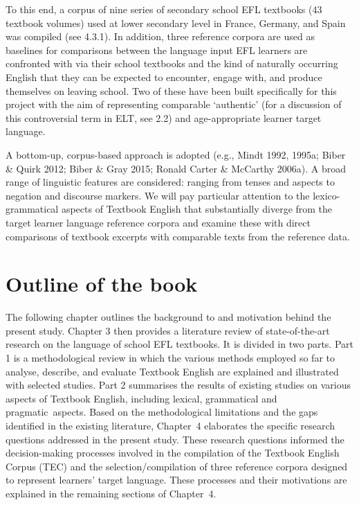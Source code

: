 \documentclass[
  letterpaper,
  DIV=11,
  numbers=noendperiod]{scrreprt}
\begin{document}
To this end, a corpus of nine series of secondary school EFL textbooks
(43 textbook volumes) used at lower secondary level in France, Germany,
and Spain was compiled (see 4.3.1). In addition, three reference corpora
are used as baselines for comparisons between the language input EFL
learners are confronted with via their school textbooks and the kind of
naturally occurring English that they can be expected to encounter,
engage with, and produce themselves on leaving school. Two of these have
been built specifically for this project with the aim of representing
comparable `authentic' (for a discussion of this controversial term in
ELT, see 2.2) and age-appropriate learner target language.

A bottom-up, corpus-based approach is adopted (e.g., Mindt 1992, 1995a;
Biber \& Quirk 2012; Biber \& Gray 2015; Ronald Carter \& McCarthy
2006a). A broad range of linguistic features are considered: ranging
from tenses and aspects to negation and discourse markers. We will pay
particular attention to the lexico-grammatical aspects of Textbook
English that substantially diverge from the target learner language
reference corpora and examine these with direct comparisons of textbook
excerpts with comparable texts from the reference data.

\section{Outline of the book}\label{outline-of-the-book}

The following chapter outlines the background to and motivation behind
the present study. Chapter 3 then provides a literature review of
state-of-the-art research on the language of school EFL textbooks. It is
divided in two parts. Part 1 is a methodological review in which the
various methods employed so far to analyse, describe, and evaluate
Textbook English are explained and illustrated with selected studies.
Part 2 summarises the results of existing studies on various aspects of
Textbook English, including lexical, grammatical and pragmatic~aspects.
Based on the methodological limitations and the gaps identified in the
existing literature, Chapter~4 elaborates the specific research
questions addressed in the present study. These research questions
informed the decision-making processes involved in the compilation of
the Textbook English Corpus (TEC) and the selection/compilation of three
reference corpora designed to represent learners' target language. These
processes and their motivations are explained in the remaining sections
of Chapter~4.
\end{document}
